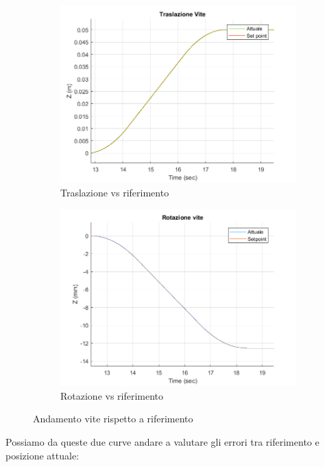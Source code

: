 \begin{figure}
	\begin{subfigure}{.45\textwidth}
		\includegraphics[width=.8\linewidth]{Immagini/Traiettorie/TrasVitePD}  
		\caption{Traslazione vs riferimento}
		\label{fig:sub-v1}
	\end{subfigure}
	\begin{subfigure}{.45\textwidth}
		\includegraphics[width=.8\linewidth]{Immagini/Traiettorie/RotVitePD}  
		\caption{Rotazione vs riferimento}
		\label{fig:sub-v2}
	\end{subfigure}
	\caption{Andamento vite rispetto a riferimento}
	\label{fig:ViteMovimenti}
\end{figure}
Possiamo da queste due curve andare a valutare gli errori tra riferimento e posizione attuale:
